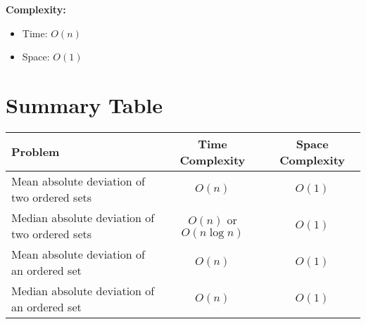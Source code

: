 \documentclass{article}
\begin{document}
\textbf{Complexity:}
\begin{itemize}
    \item Time: \( O(n) \)
    \item Space: \( O(1) \)
\end{itemize}

\section*{Summary Table}

\begin{center}
\begin{tabular}{|l|c|c|}
\hline
\textbf{Problem} & \textbf{Time Complexity} & \textbf{Space Complexity} \\
\hline
Mean absolute deviation of two ordered sets & \(O(n)\) & \(O(1)\) \\
Median absolute deviation of two ordered sets & \(O(n)\) or \(O(n \log n)\) & \(O(1)\) \\
Mean absolute deviation of an ordered set & \(O(n)\) & \(O(1)\) \\
Median absolute deviation of an ordered set & \(O(n)\) & \(O(1)\) \\
\hline
\end{tabular}
\end{center}
\end{document}
